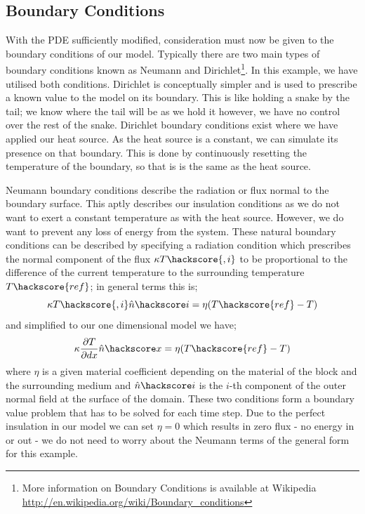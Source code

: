 \subsection{Boundary Conditions}
With the PDE sufficiently modified, consideration must now be given to the boundary conditions of our model. Typically there are two main types of boundary conditions known as Neumann and Dirichlet\footnote{More information on Boundary Conditions is available at Wikipedia \url{http://en.wikipedia.org/wiki/Boundary_conditions}}. In this example, we have utilised both conditions. Dirichlet is conceptually simpler and is used to prescribe a known value to the model on its boundary. This is like holding a snake by the tail; we know where the tail will be as we hold it however, we have no control over the rest of the snake. Dirichlet boundary conditions exist where we have applied our heat source. As the heat source is a constant, we can simulate its presence on that boundary. This is done by continuously resetting the temperature of the boundary, so that is is the same as the heat source.  

Neumann boundary conditions describe the radiation or flux normal to the boundary surface. This aptly describes our insulation conditions as we do not want to exert a constant temperature as with the heat source. However, we do want to prevent any loss of energy from the system. These natural boundary conditions can be described by specifying a radiation condition which prescribes the normal component of the flux $\kappa T\hackscore{,i}$ to be proportional
to the difference of the current temperature to the surrounding temperature $T\hackscore{ref}$; in general terms this is;
\begin{equation}
 \kappa T\hackscore{,i} \hat{n}\hackscore i = \eta (T\hackscore{ref}-T) 
\label{eqn:hdbc}
\end{equation}
and simplified to our one dimensional model we have;
\begin{equation}
\kappa \frac{\partial T}{\partial dx} \hat{n}\hackscore x = \eta (T\hackscore{ref}-T) 
\end{equation}
where $\eta$ is a given material coefficient depending on the material of the block and the surrounding medium and $\hat{n}\hackscore i$ is the $i$-th component of the outer normal field  at the surface of the domain. These two conditions form a boundary value problem that has to be solved for each time step. Due to the perfect insulation in our model we can set $\eta = 0$ which results in zero flux - no energy in or out - we do not need to worry about the Neumann terms of the general form for this example.

